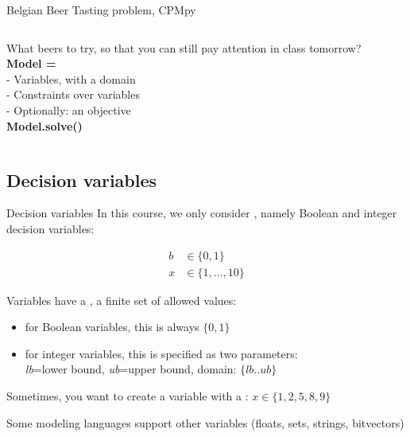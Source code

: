 \documentclass{cons-beamer}
\begin{document}
\begin{flashcardcpmpy}
\begin{frame}[fragile]{Belgian Beer Tasting problem, CPMpy}
  \begin{columns}
    \begin{column}{0.35\textwidth}
      What beers to try, so that you can still pay attention in class tomorrow? \\[2em]
      \textbf{Model =} \\[1em]
      - Variables, with a domain \\[1em]
      - Constraints over variables \\[1em]
      - Optionally: an objective \\[2em]
      \textbf{Model.solve()} \\[2em]
    \end{column}
    \begin{column}{0.65\textwidth}
      $ $\\[5.2em]
      
    \end{column}
  \end{columns}
\end{frame}
\end{flashcardcpmpy}


\subsection{Decision variables}

\begin{frame}{Decision variables}
  In this course, we only consider , namely Boolean and integer decision variables:

  \begin{align}
    b &\in \{0,1\} \\
    x &\in \{1, \ldots, 10\}
  \end{align}

  \vspace{1em}
  Variables have a , a finite set of allowed values:
  \begin{itemize}
    \item for {Boolean} variables, this is always $\{0,1\}$
    \item for {integer} variables, this is specified as two parameters: \\
    \textit{lb}=lower bound, \textit{ub}=upper bound, domain: $\{lb..ub\}$
  \end{itemize}

  \vspace{1em}
  Sometimes, you want to create a variable with a : $x \in \{1,2,5,8,9\}$

  \vspace{1em}
  Some modeling languages support other variables (floats, sets, strings, bitvectors)
\end{frame}
\end{document}
